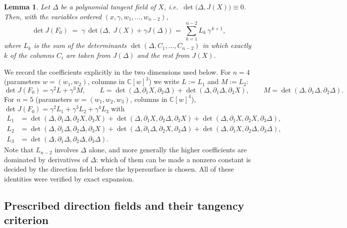 \documentclass[11pt]{article}
\theoremstyle{plain}
\newtheorem{lemma}[theorem]{Lemma}
\theoremstyle{definition}
\theoremstyle{remark}
\newcommand{\C}{\mathbb{C}}
\begin{document}
\begin{lemma}\label{lem:JL}
Let $\Delta$ be a polynomial tangent field of $X$, i.e.\
$\det\bigl(\Delta,J(X)\bigr)\equiv0$. Then, with the variables ordered
$(x,\gamma,w_1,\dots,w_{n-2})$,
\[
\det J(F_0)\;=\;\gamma\,\det\bigl(\Delta,\;J(X)+\gamma J(\Delta)\bigr)
\;=\;\sum_{k=1}^{n-2}L_k\,\gamma^{\,k+1},
\]
where $L_k$ is the sum of the determinants $\det(\Delta,C_1,\dots,C_{n-2})$ in
which exactly $k$ of the columns $C_i$ are taken from $J(\Delta)$ and the rest
from $J(X)$.
\end{lemma}

We record the coefficients explicitly in the two dimensions used below. For
$n=4$ (parameters $w=(w_1,w_2)$, columns in $\C[w]^3$) we write $L:=L_1$ and
$M:=L_2$:
\[
\det J(F_0)=\gamma^2L+\gamma^3M,\qquad
L=\det(\Delta,\partial_1X,\partial_2\Delta)+\det(\Delta,\partial_1\Delta,\partial_2X),
\qquad
M=\det(\Delta,\partial_1\Delta,\partial_2\Delta).
\]
For $n=5$ (parameters $w=(w_1,w_2,w_3)$, columns in $\C[w]^4$),
$\det J(F_0)=\gamma^2L_1+\gamma^3L_2+\gamma^4L_3$ with
\begin{align*}
L_1&=\det(\Delta,\partial_1\Delta,\partial_2X,\partial_3X)
   +\det(\Delta,\partial_1X,\partial_2\Delta,\partial_3X)
   +\det(\Delta,\partial_1X,\partial_2X,\partial_3\Delta),\\
L_2&=\det(\Delta,\partial_1\Delta,\partial_2\Delta,\partial_3X)
   +\det(\Delta,\partial_1\Delta,\partial_2X,\partial_3\Delta)
   +\det(\Delta,\partial_1X,\partial_2\Delta,\partial_3\Delta),\\
L_3&=\det(\Delta,\partial_1\Delta,\partial_2\Delta,\partial_3\Delta).
\end{align*}
Note that $L_{n-2}$ involves $\Delta$ alone, and more generally the higher
coefficients are dominated by derivatives of $\Delta$: which of them can be made
a nonzero constant is decided by the direction field before the hypersurface is
chosen. All of these identities were verified by exact expansion.

\subsection{Prescribed direction fields and their tangency criterion}\label{subsec:forms}
\end{document}
